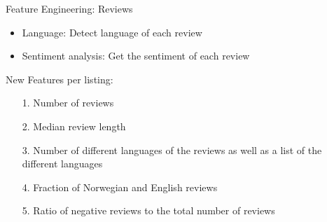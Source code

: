 \documentclass[ngerman,inputenc]{beamer}
\begin{document}
\begin{frame}{Feature Engineering: Reviews}
  \begin{itemize}
    \item Language: Detect language of each review
    \item Sentiment analysis: Get the sentiment of each review
  \end{itemize}

  \hspace{5pt}

  New Features per listing:
  \begin{itemize}
    \item[1.] Number of reviews
    \item[2.] Median review length
    \item[3.] Number of different languages of the reviews as well as a list of the different languages
    \item[4.] Fraction of Norwegian and English reviews
    \item[5.] Ratio of negative reviews to the total number of reviews
  \end{itemize}

\end{frame}
\end{document}
